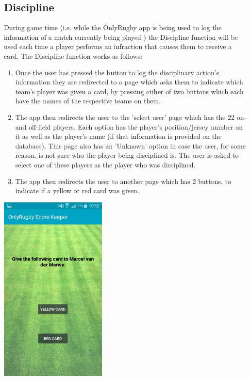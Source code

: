 \documentclass[hidelinks,a4paper,12pt]{article}
\begin{document}
	\subsection{Discipline}
		During game time (i.e. while the OnlyRugby app is being used to log the information of a match currently being played ) the Discipline function will be used each time a player performs an infraction that causes them to receive a card. The Discipline function works as follows:
		\begin{enumerate}
			\item Once the user has pressed the button to log the disciplinary action's information they are redirected to a page which asks them to indicate which team's player was given a card, by pressing either of two buttons which each have the names of the respective teams on them.
			\item The app then redirects the user to the 'select user' page which has the 22 on- and off-field players. Each option has the player's position/jersey number on it as well as the player's name (if that information is provided on the database). This page also has an 'Unknown' option in case the user, for some reason, is not sure who the player being disciplined is. The user is asked to select one of these players as the player who was disciplined.
			\item The app then redirects the user to another page which has 2 buttons, to indicate if a yellow or red card was given.
		\end{enumerate}

	\begin{center}
  		\includegraphics[width=0.4\textwidth] {./images/choose_card.jpg}\\[0.4cm]
	\end{center}
\end{document}
